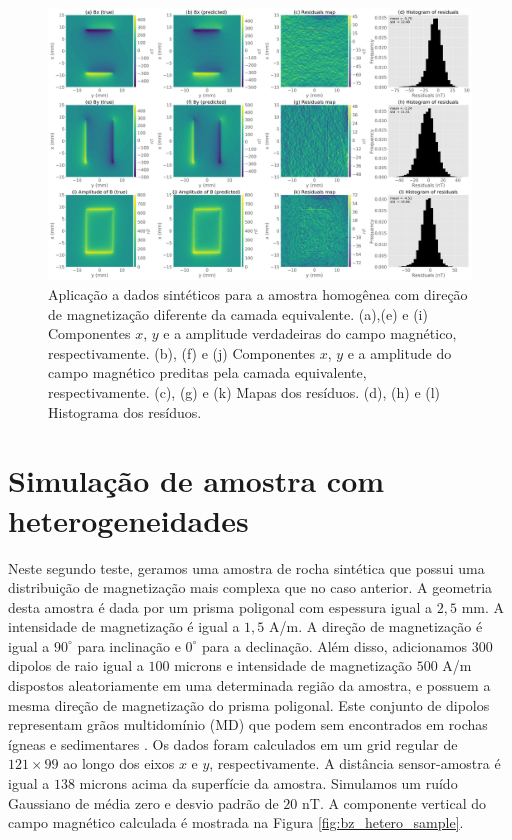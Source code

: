 \begin{figure}
	\centering
	\includegraphics[width=1.15\textwidth]{Fig/mag_vec/amostra_homo_errado/comparison_true_estimated.png}
	\caption{Aplicação a dados sintéticos para a amostra homogênea com direção de magnetização diferente da camada equivalente. (a),(e) e (i) Componentes $x$, $y$ e a amplitude verdadeiras do campo magnético, respectivamente. (b), (f) e (j) Componentes $x$, $y$ e a amplitude do campo magnético preditas pela camada equivalente, respectivamente. (c), (g) e (k) Mapas dos resíduos. (d), (h) e (l) Histograma dos resíduos.}
	\label{fig:comparison_homo_sample_difdir}
\end{figure}


\section{Simulação de amostra com heterogeneidades}
\label{sec:hetero_sample}

Neste segundo teste, geramos uma amostra de rocha sintética que possui uma distribuição de magnetização mais complexa que no caso anterior. A geometria desta amostra é dada por um prisma poligonal com espessura igual a $2,5$ mm. A intensidade de magnetização é igual a $1,5$ A/m. A direção de magnetização é igual a $90^\circ$ para inclinação e $0^\circ$ para a declinação. Além disso, adicionamos $300$ dipolos de raio igual a $100$ microns e intensidade de magnetização $500$ A/m dispostos aleatoriamente em uma determinada região da amostra, e possuem a mesma direção de magnetização do prisma poligonal. Este conjunto de dipolos representam grãos multidomínio (MD) que podem sem encontrados em rochas ígneas e sedimentares \citep{dunlop1997,butler1998,clark1997}. Os dados foram calculados em um grid regular de $121 \times 99$ ao longo dos eixos $x$ e $y$, respectivamente. A distância sensor-amostra é igual a $138$ microns acima da superfície da amostra. Simulamos um ruído Gaussiano de média zero e desvio padrão de $20$ nT. A componente vertical do campo magnético calculada é mostrada na Figura 
\ref{fig:bz_hetero_sample}.


